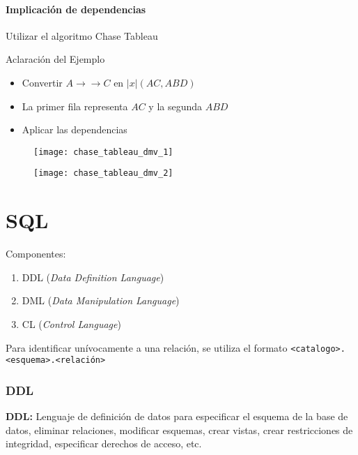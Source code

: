 \documentclass[a4paper, twoside]{article}
\begin{document}
\subsection{Implicación de dependencias}
Utilizar el algoritmo Chase Tableau

\begin{definicion}[0.9\textwidth]{Aclaración del Ejemplo}
	\begin{itemize}
		\item Convertir $A \to\to C$ en $|x| (AC , ABD)$
		\item La primer fila representa $AC$ y la segunda $ABD$
		\item Aplicar las dependencias
	\end{itemize}
\end{definicion}


\begin{figure}[H]
	\centering
	\texttt{[image: chase\_tableau\_dmv\_1]}
\end{figure}

\begin{figure}[H]
	\centering
	\texttt{[image: chase\_tableau\_dmv\_2]}
\end{figure}

\newpage
\part{SQL}
Componentes: 
\begin{enumerate}
	\item DDL (\emph{Data Definition Language})
	\item DML (\emph{Data Manipulation Language})
	\item CL (\emph{Control Language})
\end{enumerate}

Para identificar unívocamente a una relación, se utiliza el formato \texttt{<catalogo>.<esquema>.<relación>}

\section{DDL}
\textbf{DDL:} Lenguaje de definición de datos para especificar el esquema de la base de datos, eliminar relaciones, modificar esquemas, crear vistas, crear restricciones de integridad, especificar derechos de acceso, etc.
\end{document}
